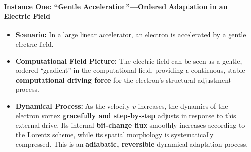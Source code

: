 \documentclass[11pt, a4paper]{article}
\begin{document}
\paragraph{Instance One: ``Gentle Acceleration''—Ordered Adaptation in an Electric Field}
\begin{itemize}
    \item \textbf{Scenario:} In a large linear accelerator, an electron is accelerated by a gentle electric field.
    \item \textbf{Computational Field Picture:} The electric field can be seen as a gentle, ordered ``gradient'' in the computational field, providing a continuous, stable \textbf{computational driving force} for the electron's structural adjustment process.
    \item \textbf{Dynamical Process:} As the velocity $v$ increases, the dynamics of the electron vortex \textbf{gracefully and step-by-step} adjusts in response to this external drive. Its internal \textbf{bit-change flux} smoothly increases according to the Lorentz scheme, while its spatial morphology is systematically compressed. This is an \textbf{adiabatic, reversible} dynamical adaptation process.
\end{itemize}
\end{document}
